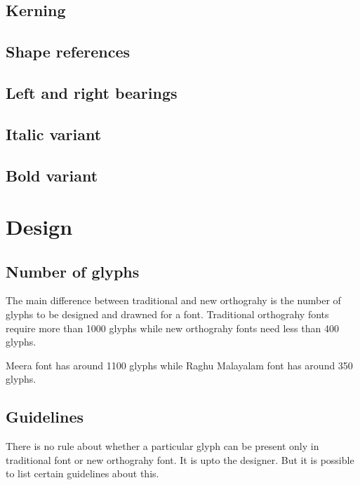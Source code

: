 \subsection {Kerning}
\subsection {Shape references}
\subsection {Left and right bearings}
\subsection {Italic variant}
\subsection {Bold variant}

\section{Design}
\subsection{Number of glyphs}

The main difference between traditional and new orthograhy is the number of 
glyphs to be designed and drawned for a font.
Traditional orthograhy fonts require more than 1000 glyphs while new orthograhy 
fonts need less than 400 glyphs.

Meera font has around 1100 glyphs while Raghu Malayalam font has around 350 
glyphs.

\subsection{Guidelines}

There is no rule about whether a particular glyph can be present only in
traditional font or new orthograhy font. It is upto the designer. But it is 
possible to list certain guidelines about this.


